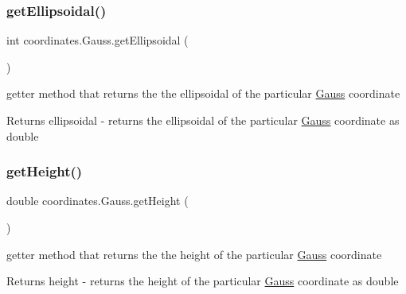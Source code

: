 \mbox{\label{classcoordinates_1_1_gauss_a5c6271983e9bb69b8d024158397f5882}} 
\subsubsection{\texorpdfstring{get\+Ellipsoidal()}{getEllipsoidal()}}
{\footnotesize\ttfamily int coordinates.\+Gauss.\+get\+Ellipsoidal (\begin{DoxyParamCaption}{ }\end{DoxyParamCaption})}



getter method that returns the the ellipsoidal of the particular \hyperlink{classcoordinates_1_1_gauss}{Gauss} coordinate 

\begin{DoxyReturn}{Returns}
ellipsoidal -\/ returns the ellipsoidal of the particular \hyperlink{classcoordinates_1_1_gauss}{Gauss} coordinate as double 
\end{DoxyReturn}
\mbox{\label{classcoordinates_1_1_gauss_a3bc39fe23752a9bccac68015c799f3fc}} 
\subsubsection{\texorpdfstring{get\+Height()}{getHeight()}}
{\footnotesize\ttfamily double coordinates.\+Gauss.\+get\+Height (\begin{DoxyParamCaption}{ }\end{DoxyParamCaption})}



getter method that returns the the height of the particular \hyperlink{classcoordinates_1_1_gauss}{Gauss} coordinate 

\begin{DoxyReturn}{Returns}
height -\/ returns the height of the particular \hyperlink{classcoordinates_1_1_gauss}{Gauss} coordinate as double 
\end{DoxyReturn}
\mbox{\label{classcoordinates_1_1_gauss_a751c889d6cc9b2acb5eeb42d888efc0f}} 
